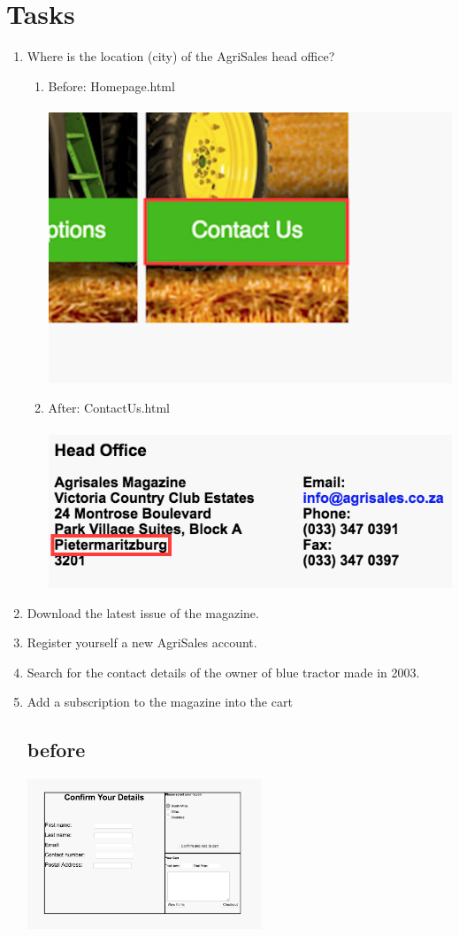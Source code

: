 \documentclass[11pt]{article}
\begin{document}
\section{Tasks}
	\begin{enumerate}
		\item Where is the location (city) of the AgriSales head office?
				\begin{enumerate}
					\item Before: Homepage.html \\ \\
						\includegraphics[width=0.5\linewidth]{../Images/Tasks/Task1Before}
					\item After: ContactUs.html \\ \\
						\includegraphics[width=0.5\linewidth]{../Images/Tasks/Task1After}
				\end{enumerate}
		\item Download the latest issue of the magazine.
		\item Register yourself a new AgriSales account.
		\item Search for the contact details of the owner of blue tractor made in 2003.
		\item Add a subscription to the magazine into the cart
		\subsection{before}
			\includegraphics[width=0.55\textwidth]{../Images/Subscriptions.png}

\end{enumerate}
\end{document}
